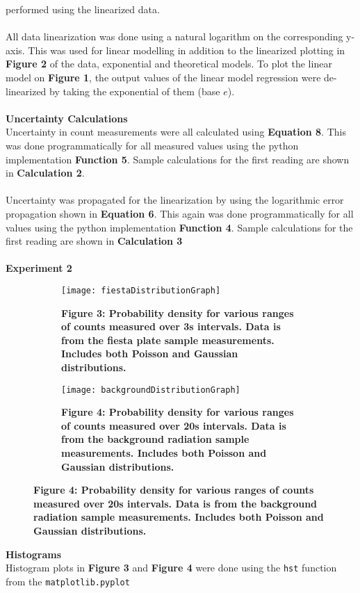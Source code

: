 \documentclass[
	letterpaper, %
	10pt, %
]{CSUniSchoolLabReport}
\begin{document}
performed using the linearized data.\\\\
All data linearization was done using a natural logarithm on the corresponding y-axis. This was used for
linear modelling in addition to the linearized plotting in \textbf{Figure 2} of the data, exponential and theoretical
models. To plot the linear model on \textbf{Figure 1}, the output values of the linear model regression were
de-linearized by taking the exponential of them (base $e$).\\\\
{\large\textbf{Uncertainty Calculations}}\\
Uncertainty in count measurements were all calculated using \textbf{Equation 8}. This was done programmatically
for all measured values using the python implementation \textbf{Function 5}. Sample calculations for the first reading
are shown in \textbf{Calculation 2}.\\\\
Uncertainty was propagated for the linearization by using the logarithmic error propagation shown in
\textbf{Equation 6}. This again was done programmatically for all values using the python implementation \textbf{Function 4}.
Sample calculations for the first reading are shown in \textbf{Calculation 3}\\\\
{\Large\textbf{Experiment 2}}
\begin{figure}[H]
	\begin{subfigure}{0.45\textwidth}
		\texttt{[image: fiestaDistributionGraph]}
		\caption{\textbf{Figure 3: Probability density for various ranges of counts measured over 3s intervals. Data is from the fiesta plate sample measurements. Includes both Poisson and Gaussian distributions. }}
	\end{subfigure}
	\quad
	\begin{subfigure}{0.45\textwidth}
		\texttt{[image: backgroundDistributionGraph]}
		\caption{\textbf{Figure 4: Probability density for various ranges of counts measured over 20s intervals. Data is from the background radiation sample measurements. Includes both Poisson and Gaussian distributions. }}
	\end{subfigure}
\end{figure}
{\large\textbf{Histograms}}\\
Histogram plots in \textbf{Figure 3} and \textbf{Figure 4} were done using the \lstinline{hst} function from the \lstinline{matplotlib.pyplot}
\end{document}

